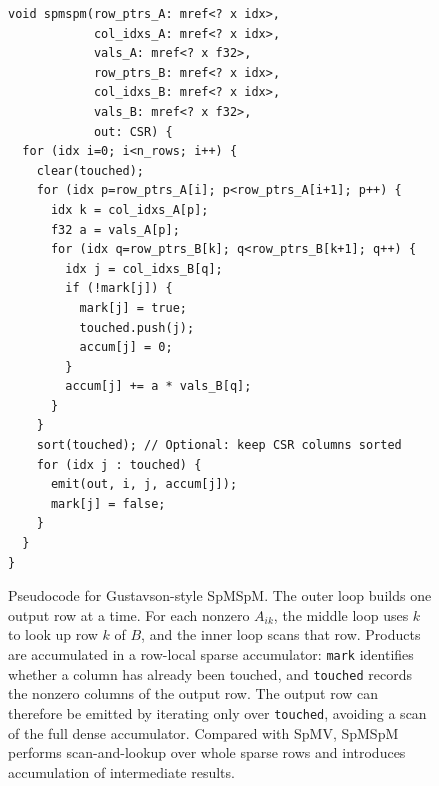 \begin{figure}
    \begin{lstlisting}[]
void spmspm(row_ptrs_A: mref<? x idx>,
            col_idxs_A: mref<? x idx>,
            vals_A: mref<? x f32>,
            row_ptrs_B: mref<? x idx>,
            col_idxs_B: mref<? x idx>,
            vals_B: mref<? x f32>,
            out: CSR) {
  for (idx i=0; i<n_rows; i++) {
    clear(touched);
    for (idx p=row_ptrs_A[i]; p<row_ptrs_A[i+1]; p++) {
      idx k = col_idxs_A[p];
      f32 a = vals_A[p];
      for (idx q=row_ptrs_B[k]; q<row_ptrs_B[k+1]; q++) {
        idx j = col_idxs_B[q];
        if (!mark[j]) {
          mark[j] = true;
          touched.push(j);
          accum[j] = 0;
        }
        accum[j] += a * vals_B[q];
      }
    }
    sort(touched); // Optional: keep CSR columns sorted
    for (idx j : touched) {
      emit(out, i, j, accum[j]);
      mark[j] = false;
    }
  }
}
    \end{lstlisting}
    \vspace{-1em}
    \caption[Pseudocode of sparse matrix-sparse matrix multiplication.]{Pseudocode for Gustavson-style SpMSpM. The outer loop builds one output row at a time. For each nonzero $A_{ik}$, the middle loop uses $k$ to look up row $k$ of $B$, and the inner loop scans that row. Products are accumulated in a row-local sparse accumulator: \texttt{mark} identifies whether a column has already been touched, and \texttt{touched} records the nonzero columns of the output row. The output row can therefore be emitted by iterating only over \texttt{touched}, avoiding a scan of the full dense accumulator. Compared with SpMV, SpMSpM performs scan-and-lookup over whole sparse rows and introduces accumulation of intermediate results.}
    \label{fig:background-spmspm-pseudocode}
\end{figure}
